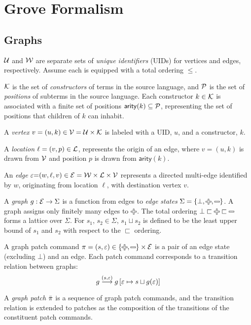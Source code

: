 \section{Grove Formalism}
\label{sec:Grove Formalism}

\subsection{Graphs}

$\U$ and $\W$ are separate sets of \emph{unique identifiers} (UIDs) for vertices and edges, respectively. Assume each is equipped with a total ordering $\leq$. 

$\K$ is the set of \emph{constructors} of terms in the source language, and $\P$ is the set of \emph{positions} of subterms in the source language. Each constructor $k\in\K$ is associated with a finite set of positions $\mathsf{arity}(k)\subseteq \P$, representing the set of positions that children of $k$ can inhabit.

A \emph{vertex} $v = (u, k) \in \V = \U \times \K$ is labeled with a UID, $u$, and a constructor, $k$. 

A \emph{location} $\ell = (v, p) \in \L$, represents the origin of an edge, where $v=(u,k)$ is drawn from $\V$ and position $p$ is drawn from $\mathsf{arity}(k)$.

An \emph{edge} $\e{=}(w, \ell, v) \in \E = \W \times \L \times \V$ represents a directed multi-edge 
    identified by $w$, 
    originating from location $\ell$, 
    with destination vertex $v$.

A \emph{graph} $g : \E \rightarrow \Sigma$ is a function from edges to \emph{edge states} $\Sigma = \SetOf{\bot, \Plus, \Minus}$. A graph assigns only finitely many edges to $\Plus$. The total ordering $\bot \sqsubset \Plus \sqsubset \Minus$ forms a lattice over $\Sigma$. For $s_1$, $s_2 \in \Sigma$, $s_1 \sqcup s_2$ is defined to be the least upper bound of $s_1$ and $s_2$ with respect to the $\sqsubset$ ordering. 

A graph patch command $\pi = (s,\e) \in \left\{\Plus, \Minus\right\} \times \E$ is a pair of an edge state (excluding $\bot$) and an edge. Each patch command corresponds to a transition relation between graphs:
\[
  g \overset{(s,\e)}{\longrightarrow} g\left[ \e \mapsto s \sqcup g(\e) \right]
\]

A \textit{graph patch} $\Q{\pi}$ is a sequence of graph patch commands, and the transition relation is extended to patches as the composition of the transitions of the constituent patch commands. 

